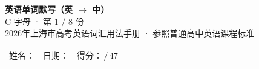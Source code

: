 \documentclass[10pt,a4paper]{article}
\begin{document}
\pagestyle{plain}

\begin{center}
{\LARGE\bfseries 英语单词默写（英 $\to$ 中）}\\[0.22em]
{\large C 字母 · 第 1 / 8 份}\\[0.18em]
{\small 2026年上海市高考英语词汇用法手册 · 参照普通高中英语课程标准}
\end{center}

\vspace{0.25em}
\noindent\begin{tabular}{@{}p{}@{}p{}@{}p{}@{}}
姓名：\underline{\hspace{2.0cm}} & 日期：\underline{\hspace{2.0cm}} & 得分：\underline{\hspace{1.3cm}}\,/\,47 \\
\end{tabular}

\vspace{0.3em}

\vspace{0.08em}
\end{document}
